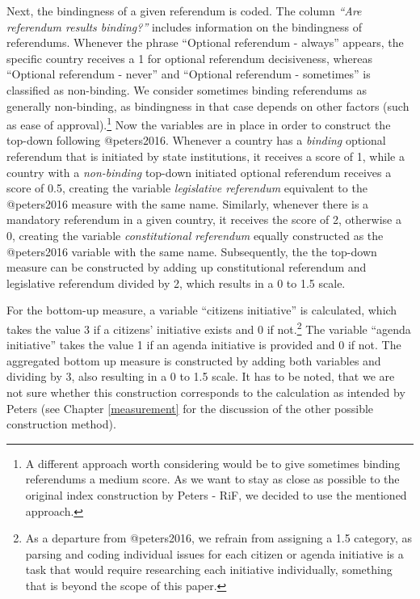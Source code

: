 \documentclass[]{article}
\let\rmarkdownfootnote\footnote%
\def\footnote{\protect\rmarkdownfootnote}
\begin{document}
Next, the bindingness of a given referendum is coded. The column
\emph{``Are referendum results binding?''} includes information on the
bindingness of referendums. Whenever the phrase ``Optional referendum -
always'' appears, the specific country receives a 1 for optional
referendum decisiveness, whereas ``Optional referendum - never'' and
``Optional referendum - sometimes'' is classified as non-binding. We
consider sometimes binding referendums as generally non-binding, as
bindingness in that case depends on other factors (such as ease of
approval).\footnote{A different approach worth considering would be to
  give sometimes binding referendums a medium score. As we want to stay
  as close as possible to the original index construction by Peters -
  RiF, we decided to use the mentioned approach.} Now the variables are
in place in order to construct the top-down following @peters2016.
Whenever a country has a \emph{binding} optional referendum that is
initiated by state institutions, it receives a score of 1, while a
country with a \emph{non-binding} top-down initiated optional referendum
receives a score of 0.5, creating the variable \emph{legislative
referendum} equivalent to the @peters2016 measure with the same name.
Similarly, whenever there is a mandatory referendum in a given country,
it receives the score of 2, otherwise a 0, creating the variable
\emph{constitutional referendum} equally constructed as the @peters2016
variable with the same name. Subsequently, the the top-down measure can
be constructed by adding up constitutional referendum and legislative
referendum divided by 2, which results in a 0 to 1.5 scale.

For the bottom-up measure, a variable ``citizens initiative'' is
calculated, which takes the value 3 if a citizens' initiative exists and
0 if not.\footnote{As a departure from @peters2016, we refrain from
  assigning a 1.5 category, as parsing and coding individual issues for
  each citizen or agenda initiative is a task that would require
  researching each initiative individually, something that is beyond the
  scope of this paper.} The variable ``agenda initiative'' takes the
value 1 if an agenda initiative is provided and 0 if not. The aggregated
bottom up measure is constructed by adding both variables and dividing
by 3, also resulting in a 0 to 1.5 scale. It has to be noted, that we
are not sure whether this construction corresponds to the calculation as
intended by Peters (see Chapter \ref{measurement} for the discussion of
the other possible construction method).
\end{document}
